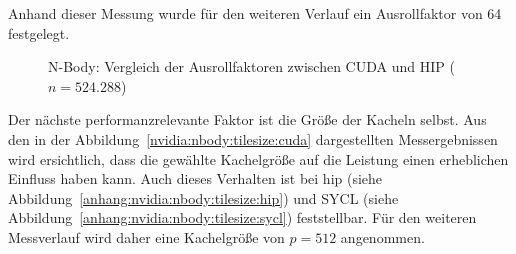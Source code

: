 Anhand dieser Messung wurde für den weiteren Verlauf ein Ausrollfaktor von
\num{64} festgelegt.

\begin{figure}
    \centering
    \caption{N-Body: Vergleich der Ausrollfaktoren zwischen CUDA und HIP ($n = 524.288$)}
    \label{nvidia:nbody:unroll:cudahip}
\end{figure}

Der nächste performanzrelevante Faktor ist die Größe der Kacheln selbst. Aus den
in der Abbildung~\ref{nvidia:nbody:tilesize:cuda} dargestellten Messergebnissen
wird ersichtlich, dass die gewählte Kachelgröße auf die Leistung einen
erheblichen Einfluss haben kann. Auch dieses Verhalten ist bei \gls{hip} (siehe
Abbildung~\ref{anhang:nvidia:nbody:tilesize:hip}) und SYCL (siehe
Abbildung~\ref{anhang:nvidia:nbody:tilesize:sycl}) feststellbar. Für den
weiteren Messverlauf wird daher eine Kachelgröße von $p = 512$ angenommen.

